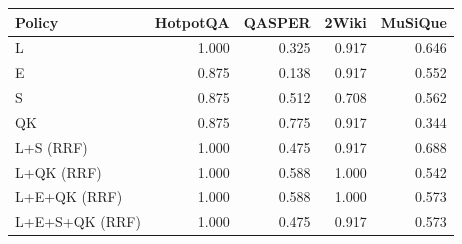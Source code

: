 \begin{tabular}{lrrrr}
\toprule
Policy & HotpotQA & QASPER & 2Wiki & MuSiQue \\
\midrule
L & 1.000 & 0.325 & 0.917 & 0.646 \\
E & 0.875 & 0.138 & 0.917 & 0.552 \\
S & 0.875 & 0.512 & 0.708 & 0.562 \\
QK & 0.875 & 0.775 & 0.917 & 0.344 \\
L+S (RRF) & 1.000 & 0.475 & 0.917 & 0.688 \\
L+QK (RRF) & 1.000 & 0.588 & 1.000 & 0.542 \\
L+E+QK (RRF) & 1.000 & 0.588 & 1.000 & 0.573 \\
L+E+S+QK (RRF) & 1.000 & 0.475 & 0.917 & 0.573 \\
\bottomrule
\end{tabular}
